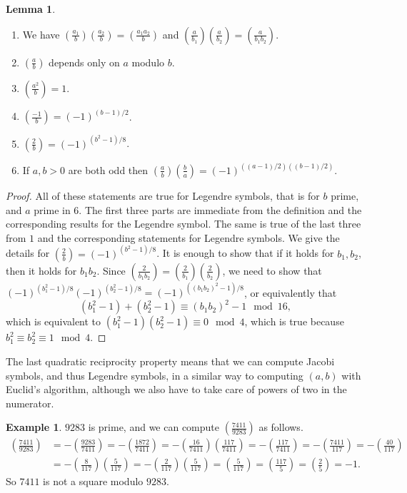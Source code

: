 \documentclass{article}
\newcommand{\rb}[1]{\left( #1 \right)}
\newcommand{\legendre}[2]{\rb{\tfrac{#1}{#2}}}
\theoremstyle{definition}\newtheorem{definition}{Definition}
\theoremstyle{definition}\newtheorem{remark}[definition]{Remark}
\theoremstyle{definition}\newtheorem*{example}{Example}
\theoremstyle{definition}\newtheorem*{note}{Note}
\newtheorem{lemma}[definition]{Lemma}
\begin{document}
\begin{lemma}
\hfill
\begin{enumerate}
\item We have $ \legendre{a_1}{b}\legendre{a_2}{b} = \legendre{a_1a_2}{b} $ and $ \legendre{a}{b_1}\legendre{a}{b_2} = \legendre{a}{b_1b_2} $.
\item $ \legendre{a}{b} $ depends only on $ a $ modulo $ b $.
\item $ \legendre{a^2}{b} = 1 $.
\item $ \legendre{-1}{b} = \rb{-1}^{\rb{b - 1} / 2} $.
\item $ \legendre{2}{b} = \rb{-1}^{\rb{b^2 - 1} / 8} $.
\item If $ a, b > 0 $ are both odd then $ \legendre{a}{b}\legendre{b}{a} = \rb{-1}^{\rb{\rb{a - 1} / 2}\rb{\rb{b - 1} / 2}} $.
\end{enumerate}
\end{lemma}

\begin{proof}
All of these statements are true for Legendre symbols, that is for $ b $ prime, and $ a $ prime in $ 6 $. The first three parts are immediate from the definition and the corresponding results for the Legendre symbol. The same is true of the last three from $ 1 $ and the corresponding statements for Legendre symbols. We give the details for $ \legendre{2}{b} = \rb{-1}^{\rb{b^2 - 1} / 8} $. It is enough to show that if it holds for $ b_1, b_2 $, then it holds for $ b_1b_2 $. Since $ \legendre{2}{b_1b_2} = \legendre{2}{b_1}\legendre{2}{b_2} $, we need to show that $ \rb{-1}^{\rb{b_1^2 - 1} / 8}\rb{-1}^{\rb{b_2^2 - 1} / 8} = \rb{-1}^{\rb{\rb{b_1b_2}^2 - 1} / 8} $, or equivalently that
$$ \rb{b_1^2 - 1} + \rb{b_2^2 - 1} \equiv \rb{b_1b_2}^2 - 1 \mod 16, $$
which is equivalent to $ \rb{b_1^2 - 1}\rb{b_2^2 - 1} \equiv 0 \mod 4 $, which is true because $ b_1^2 \equiv b_2^2 \equiv 1 \mod 4 $.
\end{proof}

The last quadratic reciprocity property means that we can compute Jacobi symbols, and thus Legendre symbols, in a similar way to computing $ \rb{a, b} $ with Euclid's algorithm, although we also have to take care of powers of two in the numerator.

\begin{example}
$ 9283 $ is prime, and we can compute $ \legendre{7411}{9283} $ as follows.
\begin{align*}
\legendre{7411}{9283}
& = -\legendre{9283}{7411} = -\legendre{1872}{7411} = -\legendre{16}{7411}\legendre{117}{7411} = -\legendre{117}{7411} = -\legendre{7411}{117} = -\legendre{40}{117} \\
& = -\legendre{8}{117}\legendre{5}{117} = -\legendre{2}{117}\legendre{5}{117} = \legendre{5}{117} = \legendre{117}{5} = \legendre{2}{5} = -1.
\end{align*}
So $ 7411 $ is not a square modulo $ 9283 $.
\end{example}
\end{document}
